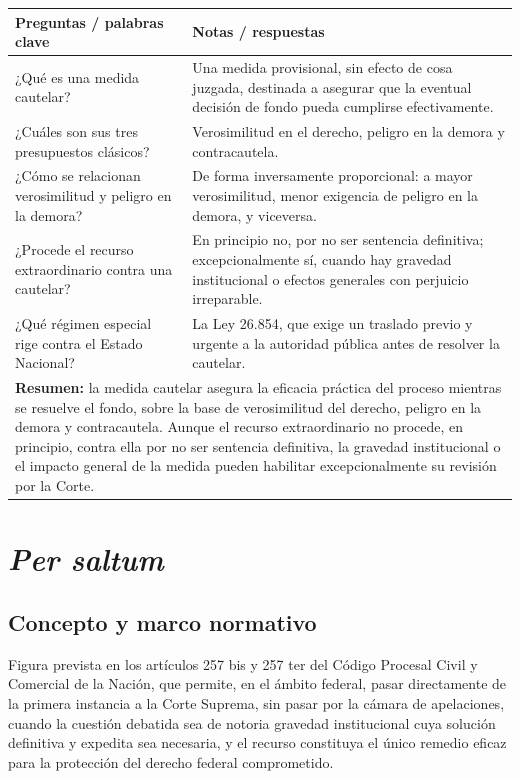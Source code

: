 \documentclass[12pt,oneside]{book}
\begin{document}
\begin{longtable}{@{}p{}p{}@{}}
\toprule
\textbf{Preguntas / palabras clave} & \textbf{Notas / respuestas} \\
\midrule
\endhead
¿Qué es una medida cautelar? & Una medida provisional, sin efecto de cosa
juzgada, destinada a asegurar que la eventual decisión de fondo pueda cumplirse
efectivamente. \\
¿Cuáles son sus tres presupuestos clásicos? & Verosimilitud en el derecho,
peligro en la demora y contracautela. \\
¿Cómo se relacionan verosimilitud y peligro en la demora? & De forma inversamente
proporcional: a mayor verosimilitud, menor exigencia de peligro en la demora, y
viceversa. \\
¿Procede el recurso extraordinario contra una cautelar? & En principio no, por no
ser sentencia definitiva; excepcionalmente sí, cuando hay gravedad institucional o
efectos generales con perjuicio irreparable. \\
¿Qué régimen especial rige contra el Estado Nacional? & La Ley 26.854, que exige
un traslado previo y urgente a la autoridad pública antes de resolver la cautelar. \\
\midrule
\multicolumn{2}{p{0.95\textwidth}}{\textbf{Resumen:} la medida cautelar asegura
la eficacia práctica del proceso mientras se resuelve el fondo, sobre la base de
verosimilitud del derecho, peligro en la demora y contracautela. Aunque el
recurso extraordinario no procede, en principio, contra ella por no ser sentencia
definitiva, la gravedad institucional o el impacto general de la medida pueden
habilitar excepcionalmente su revisión por la Corte.} \\
\bottomrule
\end{longtable}


\chapter{\textit{Per saltum}}
\label{cap:p11}

\section{Concepto y marco normativo}

\begin{defbox}
Figura prevista en los artículos 257 bis y 257 ter del Código Procesal Civil y
Comercial de la Nación, que permite, en el ámbito federal, pasar directamente de
la primera instancia a la Corte Suprema, sin pasar por la cámara de apelaciones,
cuando la cuestión debatida sea de notoria gravedad institucional cuya solución
definitiva y expedita sea necesaria, y el recurso constituya el único remedio
eficaz para la protección del derecho federal comprometido.
\end{defbox}
\end{document}
